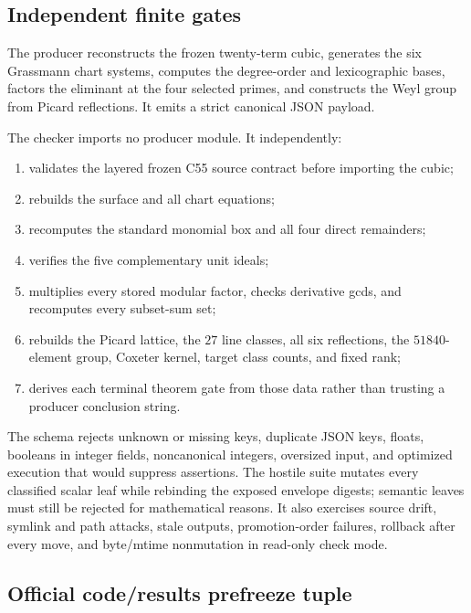 \subsection{Independent finite gates}

The producer reconstructs the frozen twenty-term cubic, generates the six
Grassmann chart systems, computes the degree-order and lexicographic bases,
factors the eliminant at the four selected primes, and constructs the Weyl
group from Picard reflections.  It emits a strict canonical JSON payload.

The checker imports no producer module.  It independently:
\begin{enumerate}[leftmargin=*]
\item validates the layered frozen C55 source contract before importing the
cubic;
\item rebuilds the surface and all chart equations;
\item recomputes the standard monomial box and all four direct remainders;
\item verifies the five complementary unit ideals;
\item multiplies every stored modular factor, checks derivative gcds, and
recomputes every subset-sum set;
\item rebuilds the Picard lattice, the \(27\) line classes, all six
reflections, the \(51840\)-element group, Coxeter kernel, target class counts,
and fixed rank;
\item derives each terminal theorem gate from those data rather than trusting
a producer conclusion string.
\end{enumerate}

The schema rejects unknown or missing keys, duplicate JSON keys, floats,
booleans in integer fields, noncanonical integers, oversized input, and
optimized execution that would suppress assertions.  The hostile suite
mutates every classified scalar leaf while rebinding the exposed envelope
digests; semantic leaves must still be rejected for mathematical reasons.
It also exercises source drift, symlink and path attacks, stale outputs,
promotion-order failures, rollback after every move, and byte/mtime
nonmutation in read-only check mode.

\subsection{Official code/results prefreeze tuple}

